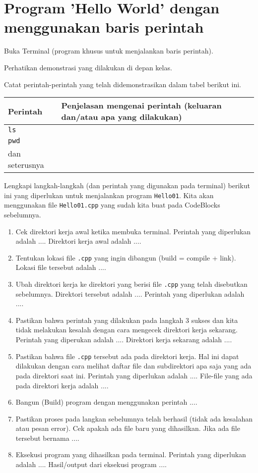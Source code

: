 \documentclass[a4paper,11pt]{extarticle}
\begin{document}
\section{Program 'Hello World' dengan menggunakan baris perintah}

Buka Terminal (program khusus untuk menjalankan baris perintah).

Perhatikan demonstrasi yang dilakukan di depan kelas.

Catat perintah-perintah yang telah didemonstrasikan dalam tabel berikut ini.

{\centering
\begin{tabular}{|p{}|p{}|}
\hline
Perintah & Penjelasan mengenai perintah (keluaran dan/atau apa yang dilakukan) \\
\hline
\texttt{ls} & \\
\texttt{pwd} & \\
dan seterusnya & \\
\hline
\end{tabular}
}

Lengkapi langkah-langkah (dan perintah yang digunakan pada terminal) berikut ini yang
diperlukan untuk menjalankan program \texttt{Hello01}. Kita akan menggunakan
file \texttt{Hello01.cpp} yang sudah kita buat pada CodeBlocks sebelumnya.

\begin{enumerate}
\item Cek direktori kerja awal ketika membuka terminal.
   Perintah yang diperlukan adalah ....
   Direktori kerja awal adalah ....
%
\item Tentukan lokasi file \texttt{.cpp} yang ingin dibangun
   (\textsf{build = compile + link}). Lokasi file tersebut adalah ....
%
\item Ubah direktori kerja ke direktori yang berisi file \texttt{.cpp} yang telah
   disebutkan sebelumnya.
   Direktori tersebut adalah ....
   Perintah yang diperlukan adalah ....
%
\item Pastikan bahwa perintah yang dilakukan pada langkah 3 sukses dan kita
   tidak melakukan kesalah dengan cara mengecek direktori kerja sekarang.
   Perintah yang diperukan adalah ....
   Direktori kerja sekarang adalah ....
%
\item Pastikan bahwa file \texttt{.cpp} tersebut ada pada direktori kerja.
   Hal ini dapat dilakukan dengan cara melihat daftar file dan subdirektori apa
   saja yang ada pada direktori saat ini.
   Perintah yang diperlukan adalah ....
   File-file yang ada pada direktori kerja adalah ....
%
\item Bangun (\textsf{Build}) program dengan menggunakan perintah ....
%
\item Pastikan proses pada langkan sebelumnya telah berhasil (tidak ada kesalahan atau pesan error).
   Cek apakah ada file baru yang dihasilkan.
   Jika ada file tersebut bernama ....
%
\item Eksekusi program yang dihasilkan pada terminal.
   Perintah yang diperlukan adalah ....
   Hasil/output dari eksekusi program
   ....
\end{enumerate}
\end{document}
